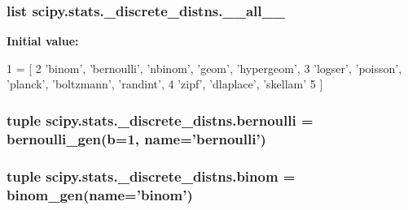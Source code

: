 \subsubsection[{\+\_\+\+\_\+all\+\_\+\+\_\+}]{\setlength{\rightskip}{0pt plus 5cm}list scipy.\+stats.\+\_\+discrete\+\_\+distns.\+\_\+\+\_\+all\+\_\+\+\_\+}\label{namespacescipy_1_1stats_1_1__discrete__distns_a83706ca7068fd4b3d26562aa79b3113c}
{\bfseries Initial value\+:}
\begin{DoxyCode}
1 = [
2         \textcolor{stringliteral}{'binom'}, \textcolor{stringliteral}{'bernoulli'}, \textcolor{stringliteral}{'nbinom'}, \textcolor{stringliteral}{'geom'}, \textcolor{stringliteral}{'hypergeom'},
3         \textcolor{stringliteral}{'logser'}, \textcolor{stringliteral}{'poisson'}, \textcolor{stringliteral}{'planck'}, \textcolor{stringliteral}{'boltzmann'}, \textcolor{stringliteral}{'randint'},
4         \textcolor{stringliteral}{'zipf'}, \textcolor{stringliteral}{'dlaplace'}, \textcolor{stringliteral}{'skellam'}
5         ]
\end{DoxyCode}
\hypertarget{namespacescipy_1_1stats_1_1__discrete__distns_a13a787204cac1e0ea68389a2f7f5a1f0}{}
\subsubsection[{bernoulli}]{\setlength{\rightskip}{0pt plus 5cm}tuple scipy.\+stats.\+\_\+discrete\+\_\+distns.\+bernoulli = {\bf bernoulli\+\_\+gen}({\bf b}=1, name='bernoulli')}\label{namespacescipy_1_1stats_1_1__discrete__distns_a13a787204cac1e0ea68389a2f7f5a1f0}
\hypertarget{namespacescipy_1_1stats_1_1__discrete__distns_a150b4c1458a7c69d4c85e2408f25fbe2}{}
\subsubsection[{binom}]{\setlength{\rightskip}{0pt plus 5cm}tuple scipy.\+stats.\+\_\+discrete\+\_\+distns.\+binom = {\bf binom\+\_\+gen}(name='binom')}\label{namespacescipy_1_1stats_1_1__discrete__distns_a150b4c1458a7c69d4c85e2408f25fbe2}
\hypertarget{namespacescipy_1_1stats_1_1__discrete__distns_ad85ac97a7d5fd92f96c97845f8cd3edf}{}
